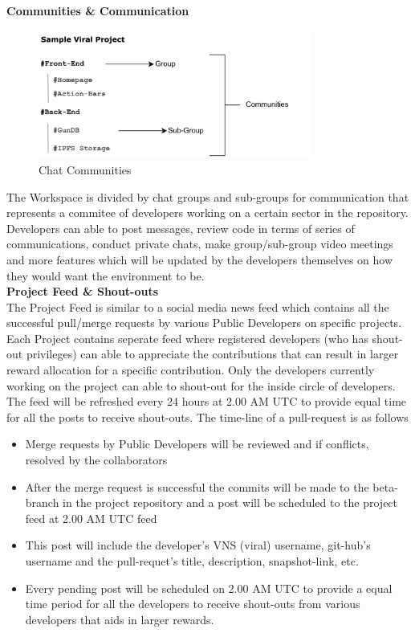 \documentclass[10pt]{article}
\begin{document}
\textbf{Communities \& Communication}\\

\begin{figure}[H]
\begin{center}
\includegraphics[width=9cm]{chat-community}
\caption{Chat Communities}
\end{center}
\end{figure}

The Workspace is divided by chat groups and sub-groups for communication that represents a commitee of developers working on a certain sector in the repository. Developers can able to post messages, review code in terms of series of communications, conduct private chats, make group/sub-group video meetings and more features which will be updated by the developers themselves on how they would want the environment to be.\\

\textbf{Project Feed \& Shout-outs}\\

The Project Feed is similar to a social media news feed which contains all the successful pull/merge requests by various Public Developers on specific projects. Each Project contains seperate feed where registered developers (who has shout-out privileges) can able to appreciate the contributions that can result in larger reward allocation for a specific contribution. Only the developers currently working on the project can able to shout-out for the inside circle of developers. The feed will be refreshed every 24 hours at 2.00 AM UTC to provide equal time for all the posts to receive shout-outs. The time-line of a pull-request is as follows
\begin{itemize}[leftmargin=+0.2in]
\item Merge requests by Public Developers will be reviewed and if conflicts, resolved by the collaborators
\item After the merge request is successful the commits will be made to the beta-branch in the project repository and a post will be scheduled to the project feed at 2.00 AM UTC feed
\item This post will include the developer's VNS (viral) username, git-hub's username and the pull-requet's title, description, snapshot-link, etc.
\item Every pending post will be scheduled on 2.00 AM UTC to provide a equal time period for all the developers to  receive shout-outs from various developers that aids in larger rewards. 
\end{itemize}
\end{document}
